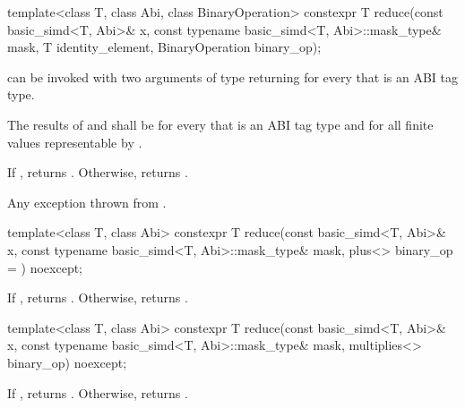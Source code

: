 \begin{itemdecl}
template<class T, class Abi, class BinaryOperation>
  constexpr T reduce(const basic_simd<T, Abi>& x, const typename basic_simd<T, Abi>::mask_type& mask,
                     T identity_element, BinaryOperation binary_op);
\end{itemdecl}

\begin{itemdescr}
  \pnum\mandates
   can be invoked with two arguments of type  returning  for every  that is an ABI tag type.

  \pnum\expects
  The results of  and  shall be  for every  that is an ABI tag type and for all finite values  representable by .

  \pnum\returns
  If , returns .
  Otherwise, returns  \forallmaskedi.

  \pnum\throws
  Any exception thrown from .
\end{itemdescr}

\begin{itemdecl}
template<class T, class Abi>
  constexpr T reduce(const basic_simd<T, Abi>& x, const typename basic_simd<T, Abi>::mask_type& mask,
                     plus<> binary_op = {}) noexcept;
\end{itemdecl}

\begin{itemdescr}
  \pnum\returns
  If , returns . Otherwise, returns  \forallmaskedi.
\end{itemdescr}

\begin{itemdecl}
template<class T, class Abi>
  constexpr T reduce(const basic_simd<T, Abi>& x, const typename basic_simd<T, Abi>::mask_type& mask,
                     multiplies<> binary_op) noexcept;
\end{itemdecl}

\begin{itemdescr}
  \pnum\returns
  If , returns . Otherwise, returns  \forallmaskedi.
\end{itemdescr}

